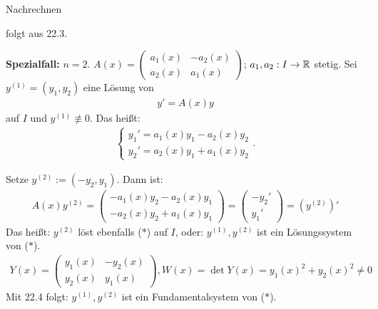 \documentclass[a4paper,oneside,DIV15,BCOR12mm,chapterprefix=true,headings=onelinechapter]{scrbook}
\begin{document}
\begin{beweise}
\item Nachrechnen
\item folgt aus 22.3.
\end{beweise}


\textbf{Spezialfall:} $n=2$. $A(x) = \begin{pmatrix} a_1(x) & -a_2(x) \\ a_2(x) & a_1(x) \end{pmatrix}$; $a_1, a_2 : I \to \mathbb{R}$ stetig. Sei $y^{(1)} = (y_1, y_2)$ eine Lösung von
\begin{align*}
\tag{$*$} y' = A(x) y
\end{align*}
auf $I$ und $y^{(1)} \not\equiv 0$. Das heißt:
\begin{align*}
\begin{cases}
y_1' = a_1(x) y_1 - a_2(x) y_2 \\
y_2' = a_2(x) y_1 + a_1(x) y_2
\end{cases}.
\end{align*}

Setze $y^{(2)} := (-y_2, y_1)$. Dann ist:
\begin{align*}
A(x) y^{(2)} = \begin{pmatrix} -a_1(x) y_2 - a_2(x) y_1 \\ -a_2(x) y_2 + a_1(x) y_1 \end{pmatrix} = \begin{pmatrix} -y_2' \\ y_1' \end{pmatrix} = \left( y^{(2)} \right)'
\end{align*}
Das heißt: $y^{(2)}$ löst ebenfalls ($*$) auf $I$, oder: $y^{(1)}, y^{(2)}$ ist ein Lösungssystem von ($*$).
\begin{align*}
Y(x) = \begin{pmatrix} y_1(x) & -y_2(x) \\ y_2(x) & y_1(x) \end{pmatrix}, W(x) = \det Y(x) = y_1(x)^2 + y_2(x)^2 \neq 0
\end{align*}
Mit 22.4 folgt: $y^{(1)}, y^{(2)}$ ist ein Fundamentalsystem von ($*$).
\end{document}
